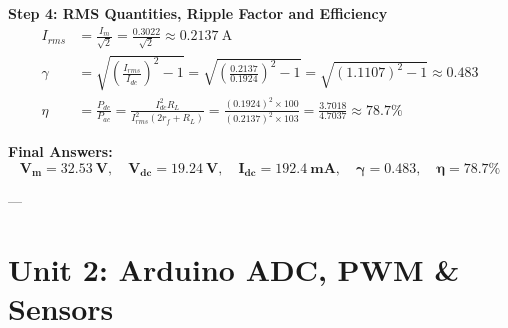 \begin{example}
\textbf{Step 4: RMS Quantities, Ripple Factor and Efficiency}
\begin{align*}
    I_{rms} &= \frac{I_m}{\sqrt{2}} = \frac{0.3022}{\sqrt{2}} \approx \SI{0.2137}{\ampere} \\
    \gamma &= \sqrt{\left(\frac{I_{rms}}{I_{dc}}\right)^2 - 1} = \sqrt{\left(\frac{0.2137}{0.1924}\right)^2 - 1} = \sqrt{(1.1107)^2 - 1} \approx 0.483 \\
    \eta &= \frac{P_{dc}}{P_{ac}} = \frac{I_{dc}^2 R_L}{I_{rms}^2 (2r_f + R_L)} = \frac{(0.1924)^2 \times 100}{(0.2137)^2 \times 103} = \frac{3.7018}{4.7037} \approx 78.7\%
\end{align*}

\textbf{Final Answers:}
$$\mathbf{V_m = \SI{32.53}{\volt}, \quad V_{dc} = \SI{19.24}{\volt}, \quad I_{dc} = \SI{192.4}{\milli\ampere}, \quad \gamma = 0.483, \quad \eta = 78.7\%}$$
\end{example}

---

\section{Unit 2: Arduino ADC, PWM \& Sensors}

